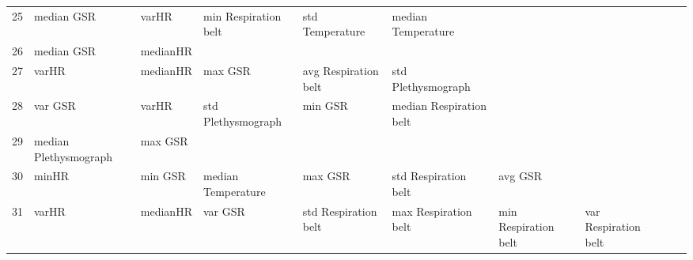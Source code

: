 \begin{landscape}
\begin{table}[]
\begin{tabular}{l|llllllll}
25       & median GSR              & varHR                   & min Respiration belt    & std Temperature         & median Temperature      &                       &                         &                         &                         &         \\
26       & median GSR              & medianHR                &                         &                         &                         &                       &                         &                         &                         &         \\
27       & varHR                   & medianHR                & max GSR                 & avg Respiration belt    & std Plethysmograph      &                       &                         &                         &                         &         \\
28       & var GSR                 & varHR                   & std Plethysmograph      & min GSR                 & median Respiration belt &                       &                         &                         &                         &         \\
29       & median Plethysmograph   & max GSR                 &                         &                         &                         &                       &                         &                         &                         &         \\
30       & minHR                   & min GSR                 & median Temperature      & max GSR                 & std Respiration belt    & avg GSR               &                         &                         &                         &         \\
31       & varHR                   & medianHR                & var GSR                 & std Respiration belt    & max Respiration belt    & min Respiration belt  & var Respiration belt    &                         &                         &         \\
\end{tabular}
\end{table}
\end{landscape}
\clearpage
